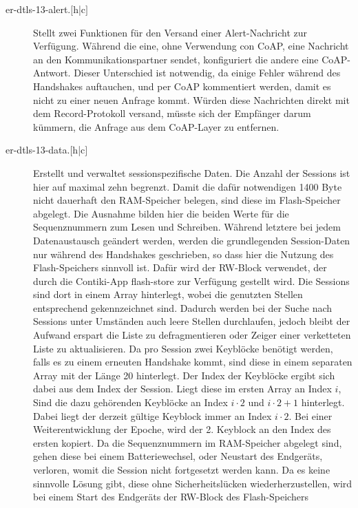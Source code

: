 \begin{description}
  \item[er-dtls-13-alert.{$[$h|c$]$}] Stellt zwei Funktionen für den Versand einer Alert-Nachricht zur Verfügung.
					Während die eine, ohne Verwendung con CoAP, eine Nachricht an den Kommunikationspartner sendet,
					konfiguriert die andere eine CoAP-Antwort. Dieser Unterschied ist notwendig, da einige Fehler während
					des Handshakes auftauchen, und per CoAP kommentiert werden, damit es nicht zu einer neuen Anfrage kommt.
					Würden diese Nachrichten direkt mit dem Record-Protokoll versand, müsste sich der Empfänger darum kümmern,
					die Anfrage aus dem CoAP-Layer zu entfernen.
  \item[er-dtls-13-data.{$[$h|c$]$}] Erstellt und verwaltet sessionspezifische Daten. Die Anzahl der Sessions ist hier auf maximal zehn begrenzt.
					Damit die dafür notwendigen 1400 Byte nicht dauerhaft den RAM-Speicher belegen, sind diese im Flash-Speicher
					abgelegt. Die Ausnahme bilden hier die beiden Werte für die Sequenznummern zum Lesen und Schreiben.
					Während letztere bei jedem Datenaustausch geändert werden, werden die grundlegenden Session-Daten nur während
					des Handshakes geschrieben, so dass hier die Nutzung des Flash-Speichers sinnvoll ist. Dafür wird der RW-Block
					verwendet, der durch die Contiki-App flash-store zur Verfügung gestellt wird. Die Sessions sind dort in einem
					Array hinterlegt, wobei die genutzten Stellen entsprechend gekennzeichnet sind. Dadurch werden bei der Suche
					nach Sessions unter Umständen auch leere Stellen durchlaufen, jedoch bleibt der Aufwand erspart die Liste zu
					defragmentieren oder Zeiger einer verketteten Liste zu aktualisieren. Da pro Session zwei Keyblöcke benötigt werden,
					falls es zu einem erneuten Handshake kommt, sind diese in einem separaten Array mit der Länge 20 hinterlegt.
					Der Index der Keyblöcke ergibt sich dabei aus dem Index der Session. Liegt diese im ersten Array an Index $ i $,
					Sind die dazu gehörenden Keyblöcke an Index $ i\cdot2 $ und $ i\cdot2+1 $ hinterlegt. Dabei liegt der derzeit gültige
					Keyblock immer an Index $ i\cdot2 $. Bei einer Weiterentwicklung der Epoche, wird der 2. Keyblock an den Index
					des ersten kopiert. Da die Sequenznummern im RAM-Speicher abgelegt sind, gehen diese bei einem Batteriewechsel,
					oder Neustart des Endgeräts, verloren, womit die Session nicht fortgesetzt werden kann. Da es keine sinnvolle Lösung gibt,
					diese ohne Sicherheitslücken wiederherzustellen, wird bei einem Start des Endgeräts der RW-Block des Flash-Speichers

\end{description}

